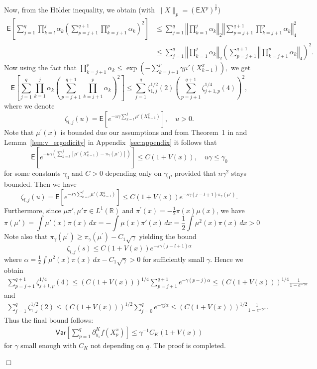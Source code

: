 \documentclass[bj]{imsart}
\newcommand{\proofendsign}{$\Box$}
\newenvironment{proof}{{\noindent \bf Proof }}
 {{\hspace*{\fill}\proofendsign\par\bigskip}}
\begin{document}
\begin{proof}
Now, from the H\"older inequality, we obtain (with $\|X\|_p = (\mathsf{E}X^p)^{\frac{1}{p}}$)
\begin{align*}
\mathsf{E}\left[\sum_{j=1}^{q}\prod_{k=l}^{j}\alpha_{k}\left( \sum_{p=j+1}^{q+1}\prod_{k=j+1}^{p}\alpha_{k}\right)^{2}\right] & \leq\sum_{j=1}^{q}\left\Vert \prod_{k=1}^{j}\alpha_{k}\right\Vert _{2}\left\Vert \sum_{p=j+1}^{q+1} \prod_{k=j+1}^{p}\alpha_{k}\right\Vert _{4}^{2}\\
 & \leq\sum_{j=1}^{q} \left\Vert \prod_{k=1}^{j}\alpha_{k}\right\Vert _{2}\left(\sum_{p=j+1}^{q+1}\left\Vert \prod_{k=j+1}^{p}\alpha_{k}\right\Vert _{4}\right)^{2}.
\end{align*}
Now using the fact that $\prod\limits_{k=j+1}^{p}\alpha_{k} \leq \exp\left(-\sum\limits_{k=j+1}^{p}\gamma\mu'(X_{k-1}^x)\right),$
we get
\[
\mathsf{E}\left[\sum_{j=1}^{q}\prod_{k=1}^{j}\alpha_{k}\left(\sum_{p=j+1}^{q+1}\prod_{k=j+1}^{p}\alpha_{k}\right)^{2}\right]\leq\sum_{j=1}^{q} \zeta^{1/2}_{1,j}(2) \left(\sum_{p=j+1}^{q+1} \zeta^{1/4}_{j+1,p}(4)\right)^{2},
\]
where we denote
\[
\zeta_{l,j}(u)=\mathsf{E}\left[e^{-u\gamma\sum_{k=l}^{j}\mu'(X^x_{k-1})}\right],\quad u>0.
\]
Note that $\mu^{\prime}(x)$ is bounded due  our assumptions and from Theorem~1 in \cite{delyon1999small} and Lemma~\ref{lem:v_ergodicity} in Appendix~\ref{sec:appendix} it follows that
\[
\mathsf{E}\left[e^{-u\gamma\left(\sum_{k=l}^{j}[\mu'(X^x_{k-1})-\pi_\gamma(\mu')]\right)}\right]\leq C(1+V(x)),\quad u\gamma\leq \gamma_0
\]
for some constants $\gamma_0$ and $C>0$  depending only on $\gamma_0$, provided that $n\gamma^2$ stays bounded. Then we have
\[
\zeta_{l,j}(u)=\mathsf{E}\left[e^{-s\gamma\sum_{k=l}^{j}\mu'(X^x_{k-1})}\right]\leq  C(1+V(x))e^{-s\gamma (j-l+1)\pi_\gamma(\mu')}.
\]
Furthermore, since $\mu\pi',\mu'\pi\in L^{1}(\mathbb{R})$ and $\pi^{\prime}(x) = -\frac{1}{2}\pi(x)\mu(x)$, we have
\[
\pi(\mu')=\int\mu'(x)\pi(x)\,dx=-\int\mu(x)\pi'(x)\,dx=\frac{1}{2}\int\mu^{2}(x)\pi(x)\,dx>0
\]
Note also that \(\pi_\gamma(\mu^{\prime}) \geq \pi_\gamma(\mu^{\prime}) - C_1\sqrt{\gamma}\)
yielding the bound
\[
\zeta_{l,j}(s) \leq  C(1+V(x))e^{-s\gamma(j-l+1)\alpha}
\]
where $ \alpha = \frac{1}{2}\int \mu^2(x)\pi(x)\,dx - C_1\sqrt{\gamma} > 0$ for sufficiently small $\gamma$. Hence we obtain
\begin{align*}
\sum_{p=j+1}^{q+1} \zeta^{1/4}_{j+1,p}(4) \leq (C(1+V(x)))^{1/4}\sum_{p=j+1}^{q+1}e^{-\gamma(p-j)\alpha} \leq  (C(1+V(x)))^{1/4}\frac{1}{1-e^{- \gamma\alpha}}
\end{align*}
and
\begin{align*}
\sum_{j=1}^{q} \zeta^{1/2}_{1,j}(2) \leq (C(1+V(x)))^{1/2}\sum_{j=0}^{q}e^{-\gamma j\alpha} \leq  (C(1+V(x)))^{1/2}\frac{ 1}{1-e^{- \gamma\alpha}}.
\end{align*}
Thus the final bound follows:
\begin{align*}
\mathsf{Var}\left[\sum_{p=1}^{q}\partial_{y_{1}}^{K}f\left(X^x_{p}\right)\right] \leq \gamma^{-1} C_K (1+V(x))
\end{align*}
for $\gamma$ small enough with $C_K$ not depending on $q$. The proof is completed.
\end{proof}
\end{document}
